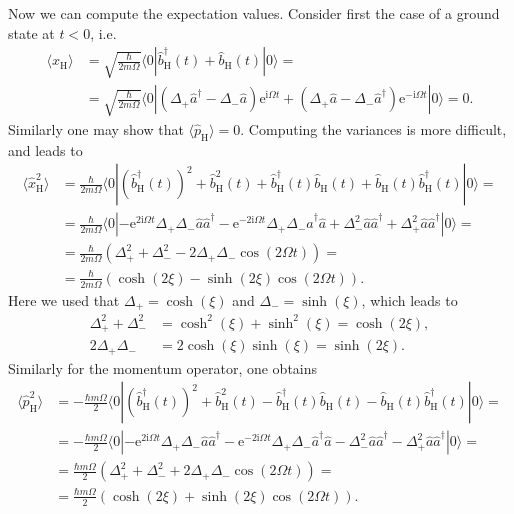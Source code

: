 \documentclass[english, parskip=full]{scrartcl}
\newcommand{\bra}{}
\newcommand{\braket}{}
\newcommand{\kla}{}
\newcommand{\tecxt}{}
\renewcommand{\i}{\text{i}}
\newcommand{\e}{\text{e}}
\begin{document}
Now we can compute the expectation values.
Consider first the case of a ground state at $t<0$, i.e. 
\begin{align}
\bra\langle \hat{x}_\tecxt\text{H} \rangle &= \sqrt{\frac{\hbar}{2m\Omega}}\braket\langle 0 | \hat{b}_\tecxt\text{H}^\dagger(t) + \hat{b}_\tecxt\text{H}(t) | 0 \rangle =\\
&= \sqrt{\frac{\hbar}{2m\Omega}}\braket\langle 0 | \kla\left( \Delta_+\hat{a}^\dagger - \Delta_-\hat{a} \right)\e^{\i\Omega t} + \kla\left( \Delta_+\hat{a} - \Delta_-\hat{a}^\dagger \right)\e^{-\i\Omega t} | 0 \rangle = 0.
\end{align}
Similarly one may show that $\bra\langle \hat{p}_\tecxt\text{H} \rangle = 0$.
Computing the variances is more difficult, and leads to
\begin{align}
\bra\langle \hat{x}_\tecxt\text{H}^2 \rangle &= \frac{\hbar}{2m\Omega}\braket\langle 0 | \kla\left( \hat{b}_\tecxt\text{H}^\dagger (t) \right)^2 + \hat{b}_\tecxt\text{H}^2(t) + \hat{b}_\tecxt\text{H}^\dagger(t)\hat{b}_\tecxt\text{H}(t)  + \hat{b}_\tecxt\text{H}(t)\hat{b}_\tecxt\text{H}^\dagger(t) | 0 \rangle = \\
&= \frac{\hbar}{2m\Omega}\braket\langle 0 | -\e^{2\i\Omega t}\Delta_+\Delta_-\hat{a}\hat{a}^\dagger - \e^{-2\i\Omega t}\Delta_+\Delta_-\hat{a}^\dagger\hat{a} + \Delta_-^2\hat{a}\hat{a}^\dagger + \Delta_+^2\hat{a}\hat{a}^\dagger  | 0 \rangle = \\
&=\frac{\hbar}{2m\Omega}\kla\left( \Delta_+^2 + \Delta_-^2 - 2\Delta_+\Delta_-\cos\kla\left( 2\Omega t \right) \right) = \\
&= \frac{\hbar}{2m\Omega}\kla\left( \cosh(2\xi) - \sinh(2\xi)\cos(2\Omega t) \right).
\end{align}
Here we used that $\Delta_+ = \cosh(\xi)$ and $\Delta_- = \sinh(\xi)$, which leads to
\begin{align}
\Delta_+^2 + \Delta_-^2 &= \cosh^2(\xi) + \sinh^2(\xi) = \cosh(2\xi) ,\\
2\Delta_+\Delta_- &= 2\cosh(\xi)\sinh(\xi) = \sinh(2\xi).
\end{align}
Similarly for the momentum operator, one obtains
\begin{align}
\bra\langle \hat{p}_\tecxt\text{H}^2 \rangle &= -\frac{\hbar m\Omega}{2}\braket\langle 0 | \kla\left( \hat{b}_\tecxt\text{H}^\dagger (t) \right)^2 + \hat{b}_\tecxt\text{H}^2(t) - \hat{b}_\tecxt\text{H}^\dagger(t)\hat{b}_\tecxt\text{H}(t)  - \hat{b}_\tecxt\text{H}(t)\hat{b}_\tecxt\text{H}^\dagger(t) | 0 \rangle = \\
&= -\frac{\hbar m\Omega}{2}\braket\langle 0 | -\e^{2\i\Omega t}\Delta_+\Delta_-\hat{a}\hat{a}^\dagger - \e^{-2\i\Omega t}\Delta_+\Delta_-\hat{a}^\dagger\hat{a} - \Delta_-^2\hat{a}\hat{a}^\dagger - \Delta_+^2\hat{a}\hat{a}^\dagger  | 0 \rangle = \\
&=\frac{\hbar m\Omega}{2}\kla\left( \Delta_+^2 + \Delta_-^2 + 2\Delta_+\Delta_-\cos\kla\left( 2\Omega t \right) \right) = \\
&= \frac{\hbar m\Omega}{2}\kla\left( \cosh(2\xi) + \sinh(2\xi)\cos(2\Omega t) \right).
\end{align}
\end{document}
